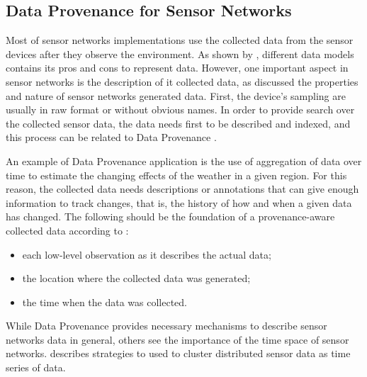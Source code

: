 \subsection{Data Provenance for Sensor Networks}

Most of sensor networks implementations use the collected data from the sensor
devices after they observe the environment. As shown by
\cite{sn-data-model-survey}, different data models contains its pros and
cons to represent data. However, one important aspect in sensor networks is the
description of it collected data, as \cite{sn-provenance} discussed the
properties and nature of sensor networks generated data. First, the device's
sampling are usually in raw format or without obvious names. In order to
provide search over the collected sensor data, the data needs first to be
described and indexed, and this process can be related to Data Provenance
\cite{db-provenance}.

An example of Data Provenance application is the use of aggregation of data
over time to estimate the changing effects of the weather in a given region.
For this reason, the collected data needs descriptions or annotations that can
give enough information to track changes, that is, the history of how and when
a given data has changed. The following should be the foundation of a
provenance-aware collected data according to \cite{sn-provenance}:

\begin{itemize}
  \item each low-level observation as it describes the actual data;
  \item the location where the collected data was generated;
  \item the time when the data was collected.
\end{itemize}

While Data Provenance provides necessary mechanisms to describe sensor networks
data in general, others see the importance of the time space of sensor
networks. \cite{sn-time-series} describes strategies to used to cluster
distributed sensor data as time series of data.